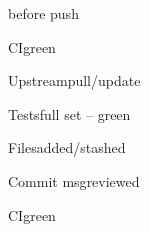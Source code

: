 \begin{checklist}{before push}
  \item{CI}{green}
  \item{Upstream}{pull/update}
  \item{Tests}{full set -- green}
  \item{Files}{added/stashed}
  \item{Commit msg}{reviewed}
  \item{CI}{green}
\end{checklist}



